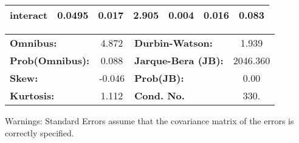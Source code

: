 \begin{center}
\begin{tabular}{lcccccc}
\textbf{interact} &       0.0495  &        0.017     &     2.905  &         0.004        &        0.016    &        0.083     \\
\bottomrule
\end{tabular}
\begin{tabular}{lclc}
\textbf{Omnibus:}       &  4.872 & \textbf{  Durbin-Watson:     } &    1.939  \\
\textbf{Prob(Omnibus):} &  0.088 & \textbf{  Jarque-Bera (JB):  } & 2046.360  \\
\textbf{Skew:}          & -0.046 & \textbf{  Prob(JB):          } &     0.00  \\
\textbf{Kurtosis:}      &  1.112 & \textbf{  Cond. No.          } &     330.  \\
\bottomrule
\end{tabular}
\end{center}

Warnings: \newline
 [1] Standard Errors assume that the covariance matrix of the errors is correctly specified.